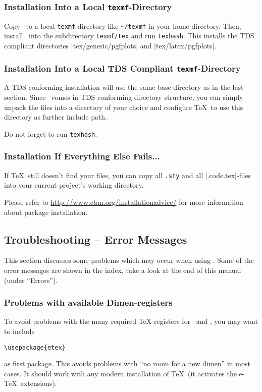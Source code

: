 \subsubsection{Installation Into a Local \texttt{texmf}-Directory}
Copy \PGFPlots\ to a local \texttt{texmf} directory like \lstinline!~/texmf! in your home directory. Then, install \PGFPlots\ into the subdirectory \lstinline!texmf/tex! and run \lstinline!texhash!. This installs the TDS compliant directories |tex/generic/pgfplots| and |tex/latex/pgfplots|.

\subsubsection{Installation Into a Local TDS Compliant \texttt{texmf}-Directory}
\label{pgfplots:tds}
A TDS conforming installation will use the same base directory as in the last section. Since \PGFPlots\ comes in TDS conforming directory structure, you can simply unpack the files into a directory of your choice and configure \TeX\ to use this directory as further include path.

Do not forget to run \lstinline!texhash!.

\subsubsection{Installation If Everything Else Fails...}
If \TeX\ still doesn't find your files, you can copy all \lstinline!.sty! and all |.code.tex|-files into your current project's working directory.

Please refer to \url{http://www.ctan.org/installationadvice/} for more information about package installation.



\subsection{Troubleshooting -- Error Messages}
This section discusses some problems which may occur when using \PGFPlots.
Some of the error messages are shown in the index, take a look at the end of this manual (under ``Errors'').


\subsubsection{Problems with available Dimen-registers}
To avoid problems with the many required \TeX-registers for \PGF\ and \PGFPlots, you may want to include
\begin{verbatim}
\usepackage{etex}
\end{verbatim}
as first package. This avoids problems with ``no room for a new dimen''
%
in most cases. It should work with any modern installation of \TeX\ (it activates the e-\TeX\ extensions).

